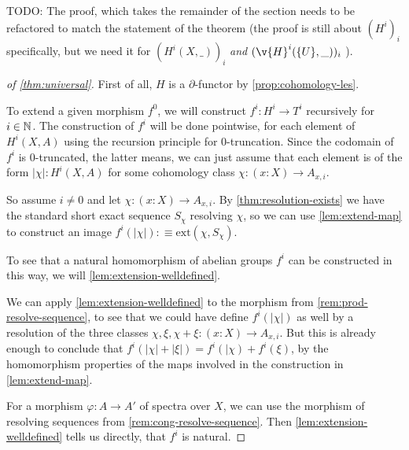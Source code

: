 TODO: The proof, which takes the remainder of the section needs to be refactored to match the statement of the theorem
(the proof is still about $(H^i)_i$ specifically, but we need it for $(H^i(X,\_))_i$ \emph{and} $(\v{H}^i(\{U\},\_))_i$ ).

\begin{proof}[of \cref{thm:universal}]
  First of all, $H$ is a $\partial$-functor by \cref{prop:cohomology-les}.

  To extend a given morphism $f^0$, 
  we will construct $f^i:H^i\to T^i$ recursively for $i\in\mathbb{N}$.
  The construction of $f^i$ will be done pointwise, for each element of $H^i(X,A)$ using the recursion principle for 0-truncation.
  Since the codomain of $f^i$ is 0-truncated, the latter means, we can just assume that each element is of the form $|\chi|:H^i(X,A)$
  for some cohomology class $\chi:(x:X)\to A_{x,i}$.

  So assume $i\neq 0$ and let $\chi:(x:X)\to A_{x,i}$.
  By \cref{thm:resolution-exists} we have the standard short exact sequence $S_\chi$ resolving $\chi$,
  so we can use \cref{lem:extend-map} to construct an image $f^i(|\chi|):\equiv \mathrm{ext}(\chi,S_\chi)$.
  
  To see that a natural homomorphism of abelian groups $f^i$ can be constructed in this way,
  we will \cref{lem:extension-welldefined}.

  We can apply \cref{lem:extension-welldefined} to the morphism from \cref{rem:prod-resolve-sequence},
  to see that we could have define $f^i(|\chi|)$ as well by
  a resolution of the three classes $\chi, \xi, \chi+\xi:(x:X)\to A_{x,i}$.
  But this is already enough to conclude that $f^i(|\chi|+|\xi|)=f^i(|\chi)+f^i(\xi)$, by the homomorphism properties of the maps involved in the construction in \cref{lem:extend-map}.

  For a morphism $\varphi:A\to A'$ of spectra over $X$,
  we can use the morphism of resolving sequences from \cref{rem:cong-resolve-sequence}.
  Then \cref{lem:extension-welldefined} tells us directly, that $f^i$ is natural.
  

\end{proof}
